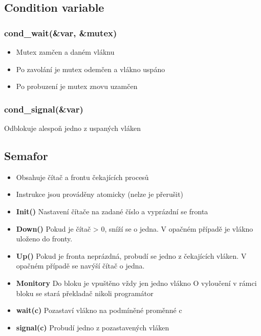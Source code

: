 \documentclass{szzclass}
\begin{document}
\subsection{Condition variable}

\subsubsection{cond\_wait(\&var, \&mutex)}

\begin{itemize}
\item Mutex zamčen a daném vláknu
\item Po zavolání je mutex odemčen a vlákno uspáno
\item Po probuzení je mutex znovu uzamčen
\end{itemize}

\subsubsection{cond\_signal(\&var)}

Odblokuje alespoň jedno z uspaných vláken

\newpage

\subsection{Semafor}

\begin{itemize}
    \item Obsahuje čítač a frontu čekajících procesů
    \item Instrukce jsou prováděny atomicky (nelze je přerušit)
    \item \textbf{Init()}\newline
    Nastavení čítače na zadané číslo a vyprázdní se fronta
    \item \textbf{Down()}\newline
    Pokud je čítač > 0, sníží se o jedna. V opačném případě je vlákno uloženo do fronty.
    \item \textbf{Up()}\newline
    Pokud je fronta neprázdná, probudí se jedno z čekajících vláken. V opačném případě se navýší čítač o jedna.
    \item \textbf{Monitory}\newline
    Do bloku je vpuštěno vždy jen jedno vlákno\newline
    O vyloučení v rámci bloku se stará překladač nikoli programátor
    \item \textbf{wait(c)}\newline
    Pozastaví vlákno na podmíněné proměnné c
    \item \textbf{signal(c)}\newline
    Probudí jedno z pozastavených vláken
\end{itemize}
\end{document}
